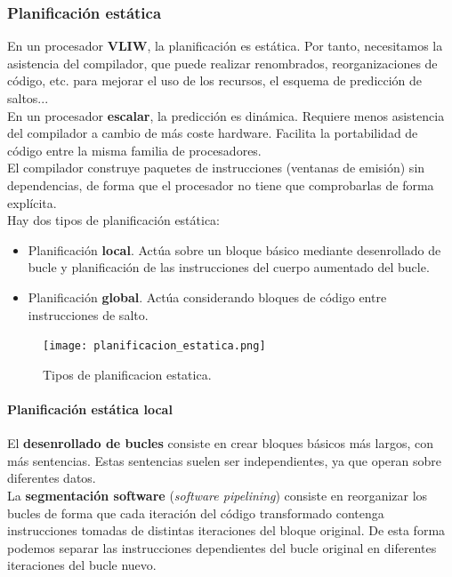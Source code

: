 \documentclass[12pt,spanish]{article}
\begin{document}
\subsubsection{Planificación estática}

En un procesador \textbf{VLIW}, la planificación es estática. Por tanto, necesitamos la asistencia del compilador, que puede realizar renombrados, reorganizaciones de código, etc. para mejorar el uso de los recursos, el esquema de predicción de saltos...\\

En un procesador \textbf{escalar}, la predicción es dinámica. Requiere menos asistencia del compilador a cambio de más coste hardware. Facilita la portabilidad de código entre la misma familia de procesadores.\\

El compilador construye paquetes de instrucciones (ventanas de emisión) sin dependencias, de forma que el procesador no tiene que comprobarlas de forma explícita.\\

Hay dos tipos de planificación estática:

\begin{itemize}
	\item Planificación \textbf{local}. Actúa sobre un bloque básico mediante desenrollado de bucle y planificación de las instrucciones del cuerpo aumentado del bucle.
	\item Planificación \textbf{global}. Actúa considerando bloques de código entre instrucciones de salto.
\end{itemize}


\begin{figure}[H]
\centering
\texttt{[image: planificacion\_estatica.png]}
\caption{Tipos de planificacion estatica.}
\end{figure}

\paragraph{Planificación estática local\\}

El \textbf{desenrollado de bucles} consiste en crear bloques básicos más largos, con más sentencias. Estas sentencias suelen ser independientes, ya que operan sobre diferentes datos.\\

La \textbf{segmentación software} (\textit{software pipelining}) consiste en reorganizar los bucles de forma que cada iteración del código transformado contenga instrucciones tomadas de distintas iteraciones del bloque original. De esta forma podemos separar las instrucciones dependientes del bucle original en diferentes iteraciones del bucle nuevo.\\
\end{document}
